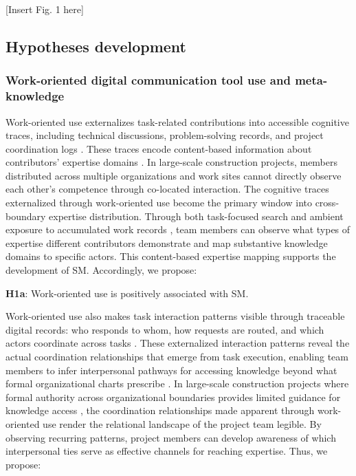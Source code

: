 \documentclass[authoryear,preprint,review,times,10pt]{elsarticle}
\begin{document}
\begin{center}[Insert Fig. 1 here]\end{center}

\subsection{Hypotheses development}
\subsubsection{Work-oriented digital communication tool use and meta-knowledge}
Work-oriented use externalizes task-related contributions into accessible cognitive traces, including technical discussions, problem-solving records, and project coordination logs \citep{hadida2015Use, jiang2013Should}. These traces encode content-based information about contributors' expertise domains \citep{lewis2003Measuring}. In large-scale construction projects, members distributed across multiple organizations and work sites cannot directly observe each other's competence through co-located interaction. The cognitive traces externalized through work-oriented use become the primary window into cross-boundary expertise distribution. Through both task-focused search and ambient exposure to accumulated work records \citep{leonardi2015Ambient}, team members can observe what types of expertise different contributors demonstrate and map substantive knowledge domains to specific actors. This content-based expertise mapping supports the development of SM. Accordingly, we propose:

\textbf{H1a}: Work-oriented use is positively associated with SM.

Work-oriented use also makes task interaction patterns visible through traceable digital records: who responds to whom, how requests are routed, and which actors coordinate across tasks \citep{borgatti2003Relational, leonardi2017Social}. These externalized interaction patterns reveal the actual coordination relationships that emerge from task execution, enabling team members to infer interpersonal pathways for accessing knowledge beyond what formal organizational charts prescribe \citep{ding2019Enterprise, leonardi2015Ambient}. In large-scale construction projects where formal authority across organizational boundaries provides limited guidance for knowledge access \citep{shen2022Largescale}, the coordination relationships made apparent through work-oriented use render the relational landscape of the project team legible. By observing recurring patterns, project members can develop awareness of which interpersonal ties serve as effective channels for reaching expertise. Thus, we propose:
\end{document}

